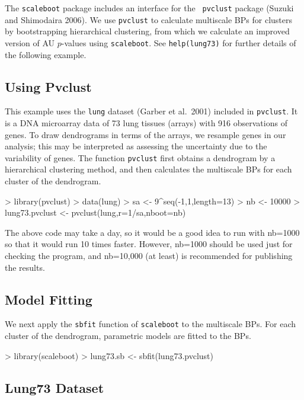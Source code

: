 \documentclass[a4paper]{amsart}
\begin{document}
The {\tt scaleboot} package includes an interface for the {\tt
pvclust} package (Suzuki and Shimodaira 2006).  We use {\tt pvclust}
to calculate multiscale BPs for clusters by bootstrapping hierarchical
clustering, from which we calculate an improved version of AU
$p$-values using {\tt scaleboot}. See {\tt help(lung73)} for further
details of the following example.

\subsection{Using Pvclust}

This example uses the {\tt lung} dataset (Garber et al.~2001) included
in {\tt pvclust}.  It is a DNA microarray data of 73 lung tissues
(arrays) with 916 observations of genes.  To draw dendrograms in terms
of the arrays, we resample genes in our analysis; this may be
interpreted as assessing the uncertainty due to the variability of
genes.  The function {\tt pvclust} first obtains a dendrogram by a
hierarchical clustering method, and then calculates the multiscale BPs
for each cluster of the dendrogram.
\begin{Schunk}
\begin{Sinput}
> library(pvclust)
> data(lung)
> sa <- 9^seq(-1,1,length=13)
> nb <- 10000
> lung73.pvclust <- pvclust(lung,r=1/sa,nboot=nb)
\end{Sinput}
\end{Schunk}
The above code may take a day, so it would be a good idea to run
with nb=1000 so that it would run 10 times faster. However, nb=1000
should be used just for checking the program, and nb=10,000 (at least)
is recommended for publishing the results.

\subsection{Model Fitting}

We next apply the {\tt sbfit} function of {\tt scaleboot} to the
multiscale BPs. For each cluster of the dendrogram, parametric models
are fitted to the BPs.
\begin{Schunk}
\begin{Sinput}
> library(scaleboot)
> lung73.sb <- sbfit(lung73.pvclust)
\end{Sinput}
\end{Schunk}

\subsection{Lung73 Dataset}
\end{document}
